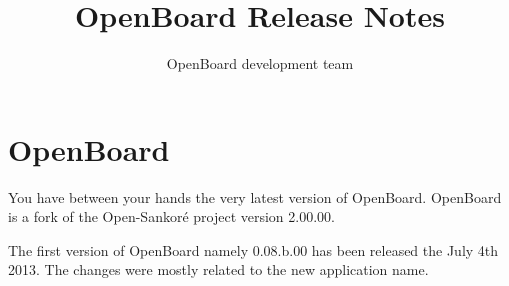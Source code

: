 \documentclass[a4paper]{report}
\begin{document}
\thispagestyle{empty} %
\title{\Huge \bfseries OpenBoard Release Notes \vspace{10mm}}
\author{OpenBoard development team}

\maketitle
\setcounter{page}{1}
\tableofcontents


\pagestyle{fancy}
\chapter*{OpenBoard}
\noindent

You have between your hands the very latest version of OpenBoard. OpenBoard is a fork of the Open-Sankor\'e project version 2.00.00. \newline

The first version of OpenBoard namely 0.08.b.00 has been released the July 4th 2013. The changes were mostly related to the new application name.

\setcounter{page}{1}
\end{document}
